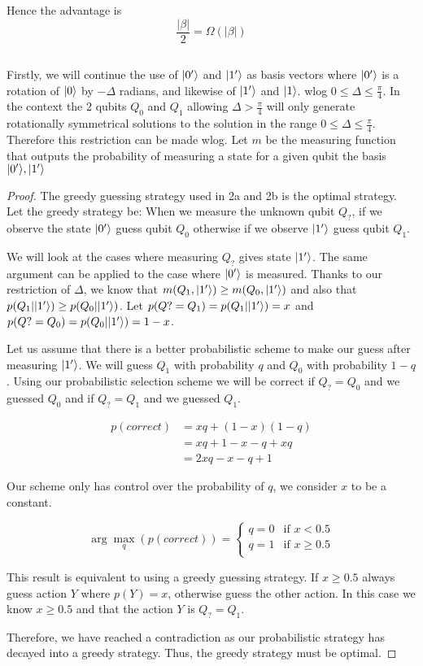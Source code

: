 Hence the advantage is
\[
    \frac{|\beta|}{2}=\Omega(|\beta|)
\]



\subsection{}
Firstly, we will continue the use of $\lvert0'\rangle$ and $\lvert1'\rangle$ as basis vectors where $\lvert0'\rangle$ is a rotation of $\lvert0\rangle$ by $-\Delta$ radians, and likewise of $\lvert1'\rangle$ and $\lvert1\rangle$.
wlog $0 \leq \Delta \leq \frac{\pi}{4}$.
In the context the 2 qubits $Q_0$ and $Q_1$ allowing $\Delta>\frac{\pi}{4}$ will only generate rotationally symmetrical solutions to the solution in the range $0 \leq \Delta \leq \frac{\pi}{4}$.
Therefore this restriction can be made wlog.
Let $m$ be the measuring function that outputs the probability of measuring a state for a given qubit the basis $\lvert0'\rangle, \lvert1'\rangle$ 

\begin{proof} The greedy guessing strategy used in 2a and 2b is the optimal strategy.
Let the greedy strategy be: When we measure the unknown qubit $Q_?$, if we observe the state $\lvert0'\rangle$ guess qubit $Q_0$ otherwise if we observe $\lvert1'\rangle$ guess qubit $Q_1$.

We will look at the cases where measuring $Q_?$ gives state $\lvert1'\rangle$.
The same argument can be applied to the case where $\lvert0'\rangle$ is measured.
Thanks to our restriction of $\Delta$, we know that $m(Q_1, \lvert1'\rangle)\geq m(Q_0, \lvert1'\rangle)$ and also that $p(Q_1|\lvert1'\rangle) \geq p(Q_0|\lvert1'\rangle)$.
Let $p(Q? = Q_1) = p(Q_1|\lvert1'\rangle) = x$ and $p(Q? = Q_0) = p(Q_0|\lvert1'\rangle) = 1-x$.

Let us assume that there is a better probabilistic scheme to make our guess after measuring $\lvert1'\rangle$.
We will guess $Q_1$ with probability $q$ and $Q_0$ with probability $1-q$.
Using our probabilistic selection scheme we will be correct if $Q_?=Q_0$ and we guessed $Q_0$ and if $Q_?=Q_1$ and we guessed $Q_1$.

\begin{align*}
    p(correct) &= xq + (1-x)(1-q)\\
    &= xq + 1-x-q+xq\\
    &= 2xq-x-q+1
\end{align*}

Our scheme only has control over the probability of $q$, we consider $x$ to be a constant.

\[
    \arg \max_q(p(correct)) = \begin{cases}
        q = 0 & \text{if } x<0.5\\
        q = 1 & \text{if } x\geq 0.5\\
    \end{cases}
\]

This result is equivalent to using a greedy guessing strategy.
If $x\geq 0.5$ always guess action $Y$ where $p(Y)=x$, otherwise guess the other action.
In this case we know $x\geq 0.5$ and that the action $Y$ is $Q_? = Q_1$.

Therefore, we have reached a contradiction as our probabilistic strategy has decayed into a greedy strategy.
Thus, the greedy strategy must be optimal. 
\end{proof}

